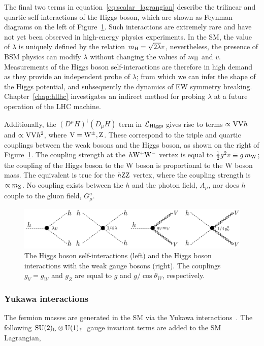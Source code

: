 The final two terms in equation~\ref{eq:scalar_lagrangian} describe the trilinear and quartic self-interactions of the Higgs boson, which are shown as Feynman diagrams on the left of Figure~\ref{fig:feynman_higgs_interactions}. Such interactions are extremely rare and have not yet been observed in high-energy physics experiments. In the SM, the value of $\lambda$ is uniquely defined by the relation $m_{\rm{H}}=\sqrt{2\lambda}v$, nevertheless, the presence of BSM physics can modify $\lambda$ without changing the values of $m_{\rm{H}}$ and $v$. Measurements of the Higgs boson self-interactions are therefore in high demand as they provide an independent probe of $\lambda$; from which we can infer the shape of the Higgs potential, and subsequently the dynamics of EW symmetry breaking. Chapter~\ref{chap:hllhc} investigates an indirect method for probing $\lambda$ at a future operation of the LHC machine.

Additionally, the $(D^\mu H)^{\dagger}(D_\mu H)$ term in $\mathcal{L}_{\rm{Higgs}}$ gives rise to terms $\propto {\rm{VV}}h$ and ${\propto {\rm{VV}}h^2}$, where ${\rm{V}}={\rm{W}}^{\pm},{\rm{Z}}$. These correspond to the triple and quartic couplings between the weak bosons and the Higgs boson, as shown on the right of Figure~\ref{fig:feynman_higgs_interactions}. The coupling strength at the $h{\rm{W^+W^-}}$ vertex is equal to $\frac{1}{2}g^2v \equiv g\,m_{\rm{W}}$; the coupling of the Higgs boson to the W boson is proportional to the W boson mass. The equivalent is true for the $h{\rm{ZZ}}$ vertex, where the coupling strength is $\propto m_{\rm{Z}}$. No coupling exists between the $h$ and the photon field, $A_\mu$, nor does $h$ couple to the gluon field, $G^a_\mu$.

\begin{figure}
  \centering
  \includegraphics[width=.9\linewidth]{Figures/theory/higgs_interaction.pdf}
  \caption[The Higgs boson interactions]
  {
    The Higgs boson self-interactions (left) and the Higgs boson interactions with the weak gauge bosons (right). The couplings $g_V=g_W$ and $g_Z$ are equal to $g$ and $g/\cos{\theta_W}$, respectively.
  }
  \label{fig:feynman_higgs_interactions}
\end{figure}

\subsubsection{Yukawa interactions}
The fermion masses are generated in the SM via the Yukawa interactions~\cite{Thomson:2013zua}. The following ${\rm{SU}(2)_{\rm{L}}}\otimes{\rm{U}}(1)_{\rm{Y}}$ gauge invariant terms are added to the SM Lagrangian,

